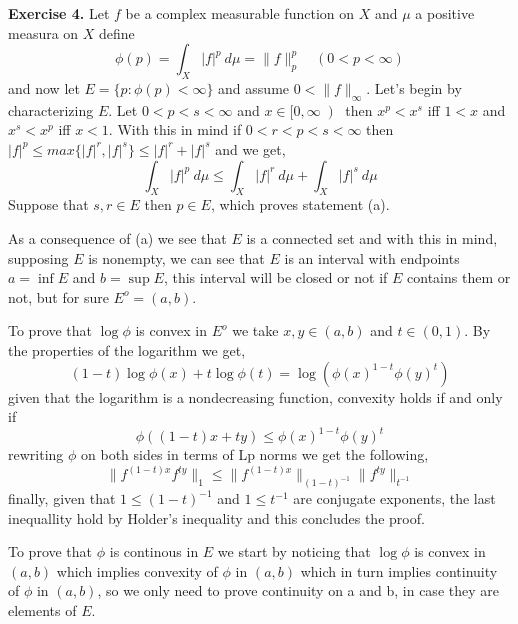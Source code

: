 \documentclass{article}
\begin{document}
\bigbreak

\begin{exercise}\textbf{Exercise 4.}
    Let $f$ be a complex measurable function on $X$ and $\mu$ a positive measura on $X$ define
    \[
        \phi \left( p \right) = \int_X |f|^p\: d\mu = \|f\|_p^p \quad \left( 0 < p < \infty \right) 
    \]
    and now let $E = \{p: \phi \left( p \right) < \infty\}$ and assume $0 < \|f\|_\infty$. Let's begin by characterizing $E$. Let $0<p<s<\infty$ and $x \in [0, \infty \left)$ then $x^p < x^s$ iff $1 < x$ and $x^s < x^p$ iff $x < 1$. With this in mind if $0<r<p<s<\infty$ then $|f|^p \le max\{|f|^r,|f|^s\} \le |f|^r+|f|^s$ and we get,
    \[
        \int_X |f|^p\: d\mu \le \int_X |f|^r\: d\mu + \int_X |f|^s\: d\mu 
    \]
    Suppose that $s,r \in E$ then $p \in E$, which proves statement (a).

\bigbreak

    As a consequence of (a) we see that $E$ is a connected set and with this in mind, supposing $E$ is nonempty, we can see that $E$ is an interval with endpoints $a= \inf E$ and $b = \sup E$, this interval will be closed or not if $E$ contains them or not, but for sure $E^o= \left( a,b \right) $.

\bigbreak

    To prove that $\log \phi$ is convex in $E^o$ we take $x,y \in \left( a,b \right) $ and $t \in \left( 0,1 \right) $. By the properties of the logarithm we get,
    \[
        \left( 1-t \right) \log \phi \left( x \right) + t \log \phi \left( t \right) = \log \left( \phi \left( x\right)^{1-t} \phi \left( y \right)^t \right) 
    \]
    given that the logarithm is a nondecreasing function, convexity holds if and only if
    \[
        \phi \left( (1-t)x + ty \right) \le \phi \left( x \right)^{1-t} \phi \left( y \right)^t
    \]
    rewriting $\phi$ on both sides in terms of Lp norms we get the following,
    \[
        \|f^{ \left( 1-t \right) x} f^{ty}\|_1 \le \|f^{ \left( 1-t \right) x}\|_ {\left( 1-t \right)^{-1} } \|f^{ty}\|_{t^{-1}}   
    \]
    finally, given that $1 \le \left( 1-t \right)^{-1}$ and $1 \le  t^{-1} $ are conjugate exponents, the last inequallity hold by Holder's inequality and this concludes the proof.

\bigbreak

    To prove that $\phi$ is continous in $E$ we start by noticing that $\log \phi$ is convex in $ \left( a,b \right) $ which implies convexity of $\phi$ in $ \left( a,b \right) $ which in turn implies continuity of $\phi$ in $ \left( a,b \right) $, so we only need to prove continuity on a and b, in case they are elements of $E$.


\end{exercise}
\end{document}
